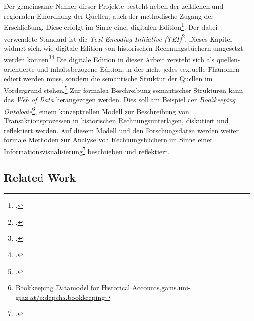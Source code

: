 \documentclass[12pt,a4paper]{article}
\begin{document}
\\
\\
Der gemeinsame Nenner dieser Projekte besteht neben der zeitlichen und regionalen Einordnung der Quellen, auch der methodische Zugang der Erschließung. Diese erfolgt im Sinne einer digitalen Edition\footcite{sahle2013digitale}. Der dabei verwendete Standard ist die \textit{Text Encoding Initiative (TEI)}\footcite{cummings2013text}. Dieses Kapitel widmet sich, wie digitale Edition von historischen Rechnungsbüchern umgesetzt werden können\footcite{tomasek2013encoding}\footcite{vogeler2016content} Die digitale Edition in dieser Arbeit versteht sich als quellen-orientierte und inhaltsbezogene Edition, in der nicht jedes textuelle Phänomen ediert werden muss, sondern die semantische Struktur der Quellen im Vordergrund stehen.\footcite{vogeler2019assertive} Zur formalen Beschreibung semantischer Strukturen kann das \textit{Web of Data} herangezogen werden. Dies soll am Beispiel der \textit{Bookkeeping Ontologie}\footnote{Bookkeeping Datamodel for Historical Accounts,\url{gams.uni-graz.at/o:depcha.bookkeeping}}, einem konzeptuellen Modell zur Beschreibung von Transaktionsprozessen in historischen Rechnungsunterlagen, diskutiert und reflektiert werden. Auf diesem Modell und den Forschungsdaten werden weiter formale Methoden zur Analyse von Rechnungsbüchern im Sinne einer Informationsvisualisierung\footcite{preim2010interaktive} beschrieben und reflektiert.

\subsection{Related Work}
\end{document}
